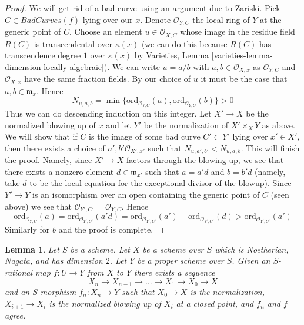 \documentclass{stacks-project}
\theoremstyle{plain}
\newtheorem{lemma}[subsection]{Lemma}
\theoremstyle{definition}
\theoremstyle{remark}
\numberwithin{equation}{subsection}
\begin{document}
\begin{proof}
\medskip\noindent
We will get rid of a bad curve using an argument due to Zariski.
Pick $C \in BadCurves(f)$ lying over our $x$. Denote $\mathcal{O}_{Y, C}$
the local ring of $Y$ at the generic point of $C$. Choose an element
$u \in \mathcal{O}_{X, C}$ whose image in the residue field
$R(C)$ is transcendental over $\kappa(x)$ (we can do this because
$R(C)$ has transcendence degree $1$ over $\kappa(x)$ by
Varieties, Lemma \ref{varieties-lemma-dimension-locally-algebraic}).
We can write $u = a/b$ with $a, b \in \mathcal{O}_{X, x}$ as
$\mathcal{O}_{Y, C}$ and $\mathcal{O}_{X, x}$ have the same
fraction fields. By our choice of $u$ it must be the case that
$a, b \in \mathfrak m_x$. Hence
$$
N_{u, a, b} = \min
\{\text{ord}_{\mathcal{O}_{Y, C}}(a), \text{ord}_{\mathcal{O}_{Y, C}}(b)\} > 0
$$
Thus we can do descending induction on this integer.
Let $X' \to X$ be the normalized blowing up of $x$
and let $Y'$ be the normalization of $X' \times_X Y$ as above. We will
show that if $C$ is the image of some bad curve $C' \subset Y'$
lying over $x' \in X'$, then
there exists a choice of $a', b' \mathcal{O}_{X', x'}$
such that $N_{u, a', b'} < N_{u, a, b}$. This will finish the proof.
Namely, since $X' \to X$ factors through the blowing up, we see that
there exists a nonzero element $d \in \mathfrak m_{x'}$ such that
$a = a' d$ and $b = b' d$ (namely, take $d$ to be the local equation
for the exceptional divisor of the blowup). Since $Y' \to Y$
is an isomorphism over an open containing the generic point of $C$
(seen above) we see that $\mathcal{O}_{Y', C'} = \mathcal{O}_{Y, C}$.
Hence
$$
\text{ord}_{\mathcal{O}_{Y, C}}(a) =
\text{ord}_{\mathcal{O}_{Y', C'}}(a' d) =
\text{ord}_{\mathcal{O}_{Y', C'}}(a') +
\text{ord}_{\mathcal{O}_{Y', C'}}(d) >
\text{ord}_{\mathcal{O}_{Y', C'}}(a')
$$
Similarly for $b$ and the proof is complete.
\end{proof}

\begin{lemma}
\label{lemma-extend-rational-map-normalized-blowing-up}
Let $S$ be a scheme. Let $X$ be a scheme over $S$ which is
Noetherian, Nagata, and has dimension $2$. Let $Y$ be a proper
scheme over $S$. Given an $S$-rational map $f : U \to Y$ from
$X$ to $Y$ there exists a sequence
$$
X_n \to X_{n - 1} \to \ldots \to X_1 \to X_0 \to X
$$
and an $S$-morphism $f_n : X_n \to Y$ such that $X_0 \to X$ is the
normalization, $X_{i + 1} \to X_i$ is the normalized blowing up of
$X_i$ at a closed point, and $f_n$ and $f$ agree.
\end{lemma}
\end{document}
